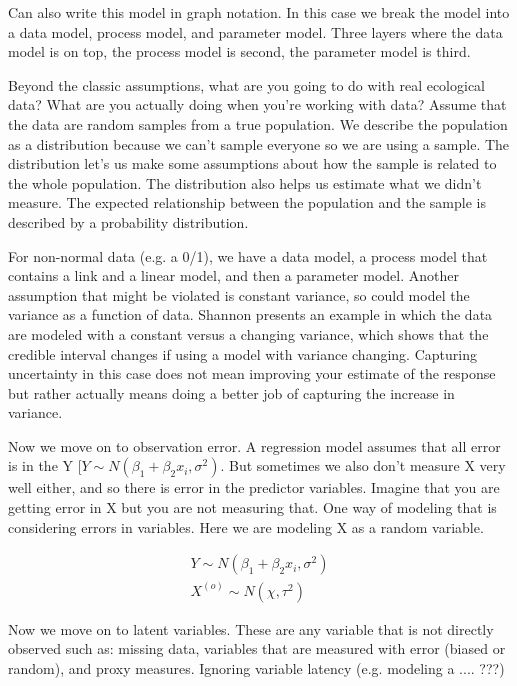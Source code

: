 \documentclass[12pt, oneside]{article}   	%
\begin{document}
Can also write this model in graph notation. In this case we break the model into a data model, process model, and parameter model. Three layers where the data model is on top, the process model is second, the parameter model is third. 
 
Beyond the classic assumptions, what are you going to do with real ecological data? What are you actually doing when you're working with data? Assume that the data are random samples from a true population. We describe the population as a distribution because we can't sample everyone so we are using a sample. The distribution let's us make some assumptions about how the sample is related to the whole population. The distribution also helps us estimate what we didn't measure. The expected relationship between the population and the sample is described by a probability distribution.
 
For non-normal data (e.g. a 0/1), we have a data model, a process model that contains a link and a linear model, and then a parameter model. Another assumption that might be violated is constant variance, so could model the variance as a function of data. Shannon presents an example in which the data are modeled with a constant versus a changing variance, which shows that the credible interval changes if using a model with variance changing. Capturing uncertainty in this case does not mean improving your estimate of the response but rather actually means doing a better job of capturing the increase in variance.

Now we move on to observation error. A regression model assumes that all error is in the Y [$Y \sim N(\beta_1 + \beta_2 x_i, \sigma^2)$. But sometimes we also don't measure X very well either, and so there is error in the predictor variables. Imagine that you are getting error in X but you are not measuring that. One way of modeling that is considering errors in variables. Here we are modeling X as a random variable.

 \begin{align}
Y \sim N(\beta_1 + \beta_2 x_i, \sigma^2) \\
X^{(o)} \sim N(\chi, \tau^2)
 \end{align}
 
Now we move on to latent variables. These are any variable that is not directly observed such as: missing data, variables that are measured with error (biased or random), and proxy measures. Ignoring variable latency (e.g. modeling a .... ???)
\end{document}

